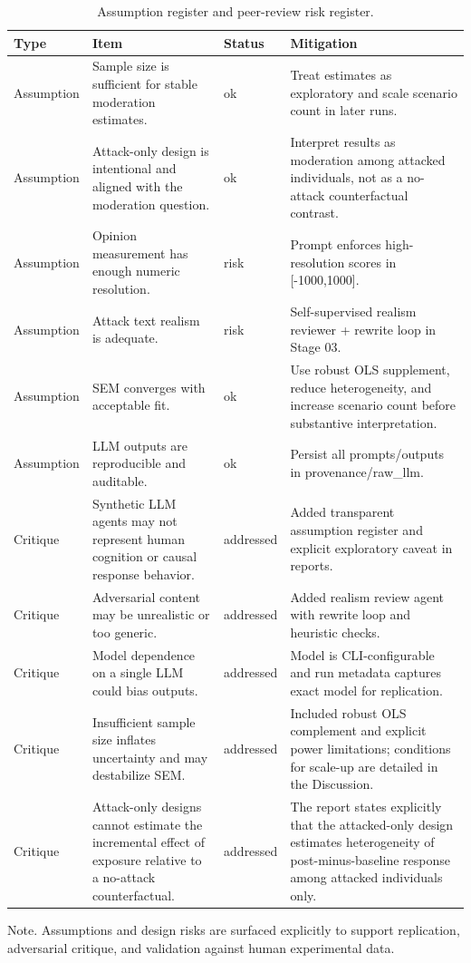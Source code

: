 \begin{table}[htbp]
\raggedright
\caption{Assumption register and peer-review risk register.}
\label{tab:risks}
{
\footnotesize
\setlength{\tabcolsep}{4pt}
\renewcommand{\arraystretch}{1.08}
\begin{tabular}{llll}
\toprule
Type & Item & Status & Mitigation \\
\midrule
Assumption & Sample size is sufficient for stable moderation estimates. & ok & Treat estimates as exploratory and scale scenario count in later runs. \\
Assumption & Attack-only design is intentional and aligned with the moderation question. & ok & Interpret results as moderation among attacked individuals, not as a no-attack counterfactual contrast. \\
Assumption & Opinion measurement has enough numeric resolution. & risk & Prompt enforces high-resolution scores in [-1000,1000]. \\
Assumption & Attack text realism is adequate. & risk & Self-supervised realism reviewer + rewrite loop in Stage 03. \\
Assumption & SEM converges with acceptable fit. & ok & Use robust OLS supplement, reduce heterogeneity, and increase scenario count before substantive interpretation. \\
Assumption & LLM outputs are reproducible and auditable. & ok & Persist all prompts/outputs in provenance/raw\_llm. \\
Critique & Synthetic LLM agents may not represent human cognition or causal response behavior. & addressed & Added transparent assumption register and explicit exploratory caveat in reports. \\
Critique & Adversarial content may be unrealistic or too generic. & addressed & Added realism review agent with rewrite loop and heuristic checks. \\
Critique & Model dependence on a single LLM could bias outputs. & addressed & Model is CLI-configurable and run metadata captures exact model for replication. \\
Critique & Insufficient sample size inflates uncertainty and may destabilize SEM. & addressed & Included robust OLS complement and explicit power limitations; conditions for scale-up are detailed in the Discussion. \\
Critique & Attack-only designs cannot estimate the incremental effect of exposure relative to a no-attack counterfactual. & addressed & The report states explicitly that the attacked-only design estimates heterogeneity of post-minus-baseline response among attacked individuals only. \\
\bottomrule
\end{tabular}
}
\par\smallskip
{\normalsize Note. Assumptions and design risks are surfaced explicitly to support replication, adversarial critique, and validation against human experimental data.}
\end{table}